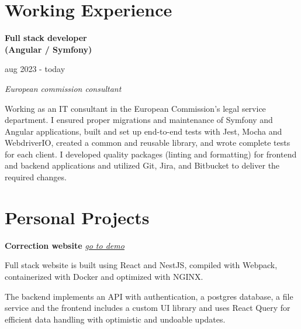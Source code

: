 \documentclass[11pt, oneside, a4paper, titlepage]{article}
\begin{document}
\begin{tcolorbox}[colframe=white, colback=white]
\begin{minipage}[t]{0.35\linewidth}
  \end{minipage}
  \hfill
  \begin{minipage}[t]{0.60\linewidth}

    \section*{Working Experience}

    \begin{minipage}{0.45\linewidth}
      \textbf{Full stack developer} \\ 
      \textbf{(Angular / Symfony)}
    \end{minipage}
    \begin{minipage}{0.5\linewidth}
      \begin{flushright}
        aug 2023 - today
      \end{flushright}
    \end{minipage}
    \vspace{0.2cm}

    \emph{European commission consultant} 
    \vspace{0.2cm}

    \small{
      Working as an IT consultant in the European Commission's legal 
      service department. I ensured proper migrations and maintenance of Symfony 
      and Angular applications, built and set up end-to-end tests with Jest, 
      Mocha and WebdriverIO, created a common and reusable library, and wrote complete 
      tests for each client. \medbreak
      I developed quality packages (linting and formatting) for frontend and 
      backend applications and utilized Git, Jira, and Bitbucket to deliver the 
      required changes.
    }

    \section*{Personal Projects 
      \small{}
    }

    \textbf{Correction website} 
    \emph{
      \href{https://tamighi.github.io/work/correction-website-demo}{\underline{go to demo}}
    }
    \medbreak

    \small{
      Full stack website is built using React and NestJS, compiled 
      with Webpack, containerized with Docker and optimized with NGINX.

      The backend implements an API with authentication, a postgres database, 
      a file service and the frontend includes a custom UI library and 
      uses React Query for efficient data handling with optimistic and 
      undoable updates.
    }
    \vspace{0.3cm}


\end{minipage}
\end{tcolorbox}
\end{document}
